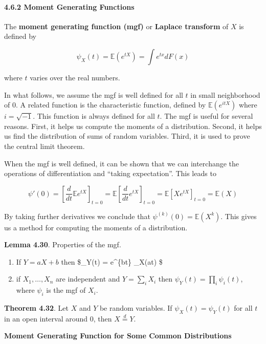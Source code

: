 \paragraph{4.6.2 Moment Generating
Functions}\label{moment-generating-functions}

The \textbf{moment generating function (mgf)} or \textbf{Laplace
transform} of \(X\) is defined by

\[ \psi_X(t) = \mathbb{E}(e^{tX}) = \int e^{tx} dF(x) \]

where \(t\) varies over the real numbers.

In what follows, we assume the mgf is well defined for all \(t\) in
small neighborhood of 0. A related function is the characteristic
function, defined by \(\mathbb{E}(e^{itX})\) where \(i = \sqrt{-1}\).
This function is always defined for all \(t\). The mgf is useful for
several reasons. First, it helps us compute the moments of a
distribution. Second, it helps us find the distribution of sums of
random variables. Third, it is used to prove the central limit theorem.

When the mgf is well defined, it can be shown that we can interchange
the operations of differentiation and ``taking expectation''. This leads
to

\[ \psi'(0) = \left[ \frac{d}{dt} \mathbb{E} e^{tX} \right]_{t = 0} = \mathbb{E} \left[ \frac{d}{dt} e^{tX} \right]_{t = 0}
= \mathbb{E}[X e^{tX}]_{t = 0} = \mathbb{E}(X)
\]

By taking further derivatives we conclude that
\(\psi^{(k)}(0) = \mathbb{E}(X^k)\). This gives us a method for
computing the moments of a distribution.

\textbf{Lemma 4.30}. Properties of the mgf.

\begin{enumerate}[tightlist,label={\arabic*.}]
\item
  If \(Y = aX + b\) then \$\psi\_Y(t) = e\^{}\{bt\} \psi\_X(at) \$
\item
  if \(X_1, \dots, X_n\) are independent and \(Y = \sum_i X_i\) then
  \(\psi_Y(t) = \prod_i \psi_{i}(t)\), where \(\psi_i\) is the mgf of
  \(X_i\).
\end{enumerate}

\textbf{Theorem 4.32}. Let \(X\) and \(Y\) be random variables. If
\(\psi_X(t) = \psi_Y(t)\) for all \(t\) in an open interval around 0,
then \(X \overset{d}= Y\).

\textbf{Moment Generating Function for Some Common Distributions}

